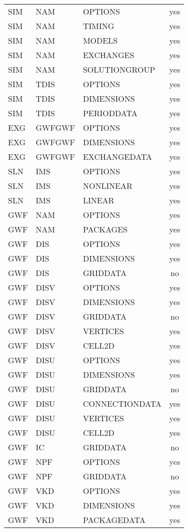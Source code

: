 \begin{longtable}{p{1.5cm} p{1.5cm} p{3cm} c}
\hline
SIM & NAM & OPTIONS & yes \\ 
SIM & NAM & TIMING & yes \\ 
SIM & NAM & MODELS & yes \\ 
SIM & NAM & EXCHANGES & yes \\ 
SIM & NAM & SOLUTIONGROUP & yes \\ 
\hline
SIM & TDIS & OPTIONS & yes \\ 
SIM & TDIS & DIMENSIONS & yes \\ 
SIM & TDIS & PERIODDATA & yes \\ 
\hline
EXG & GWFGWF & OPTIONS & yes \\ 
EXG & GWFGWF & DIMENSIONS & yes \\ 
EXG & GWFGWF & EXCHANGEDATA & yes \\ 
\hline
SLN & IMS & OPTIONS & yes \\ 
SLN & IMS & NONLINEAR & yes \\ 
SLN & IMS & LINEAR & yes \\ 
\hline
GWF & NAM & OPTIONS & yes \\ 
GWF & NAM & PACKAGES & yes \\ 
\hline
GWF & DIS & OPTIONS & yes \\ 
GWF & DIS & DIMENSIONS & yes \\ 
GWF & DIS & GRIDDATA & no \\ 
\hline
GWF & DISV & OPTIONS & yes \\ 
GWF & DISV & DIMENSIONS & yes \\ 
GWF & DISV & GRIDDATA & no \\ 
GWF & DISV & VERTICES & yes \\ 
GWF & DISV & CELL2D & yes \\ 
\hline
GWF & DISU & OPTIONS & yes \\ 
GWF & DISU & DIMENSIONS & yes \\ 
GWF & DISU & GRIDDATA & no \\ 
GWF & DISU & CONNECTIONDATA & yes \\ 
GWF & DISU & VERTICES & yes \\ 
GWF & DISU & CELL2D & yes \\ 
\hline
GWF & IC & GRIDDATA & no \\ 
\hline
GWF & NPF & OPTIONS & yes \\ 
GWF & NPF & GRIDDATA & no \\ 
\hline
GWF & VKD & OPTIONS & yes \\ 
GWF & VKD & DIMENSIONS & yes \\ 
GWF & VKD & PACKAGEDATA & yes \\ 

\end{longtable}
